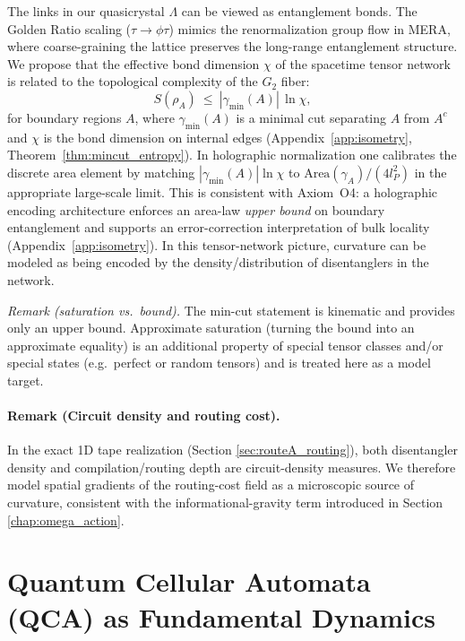 The links in our quasicrystal $\Lambda$ can be viewed as entanglement bonds. The Golden Ratio scaling ($\tau \to \phi \tau$) mimics the renormalization group flow in MERA, where coarse-graining the lattice preserves the long-range entanglement structure.
We propose that the effective bond dimension $\chi$ of the spacetime tensor network is related to the topological complexity of the $G_2$ fiber:
\begin{equation}
    S(\rho_A)\ \le\ |\gamma_{\min}(A)|\,\ln\chi,
\end{equation}
for boundary regions $A$, where $\gamma_{\min}(A)$ is a minimal cut separating $A$ from $A^c$ and $\chi$ is the bond dimension on internal edges (Appendix~\ref{app:isometry}, Theorem~\ref{thm:mincut_entropy}). In holographic normalization one calibrates the discrete area element by matching $|\gamma_{\min}(A)|\ln\chi$ to $\mathrm{Area}(\gamma_A)/(4l_P^2)$ in the appropriate large-scale limit. This is consistent with Axiom~O4: a holographic encoding architecture enforces an area-law \emph{upper bound} on boundary entanglement and supports an error-correction interpretation of bulk locality (Appendix~\ref{app:isometry}). In this tensor-network picture, curvature can be modeled as being encoded by the density/distribution of disentanglers in the network.
\par
\noindent\textit{Remark (saturation vs.\ bound).} The min-cut statement is kinematic and provides only an upper bound. Approximate saturation (turning the bound into an approximate equality) is an additional property of special tensor classes and/or special states (e.g.\ perfect or random tensors) and is treated here as a model target.

\paragraph{Remark (Circuit density and routing cost).}
In the exact 1D tape realization (Section \ref{sec:routeA_routing}), both disentangler density and compilation/routing depth are circuit-density measures. We therefore model spatial gradients of the routing-cost field as a microscopic source of curvature, consistent with the informational-gravity term introduced in Section \ref{chap:omega_action}.

\section{Quantum Cellular Automata (QCA) as Fundamental Dynamics}
\label{chap:qca}

